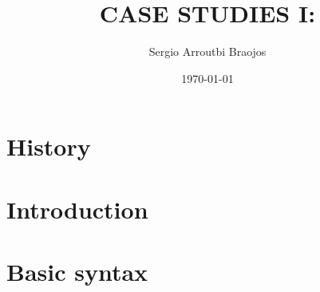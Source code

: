 \documentclass[11pt]{article}
\title{\textbf{CASE STUDIES I: }}
\author{Sergio Arroutbi Braojos}
\date{\today}
\begin{document}
\maketitle

\section{History}


\section{Introduction}


\section{Basic syntax}
\end{document}
